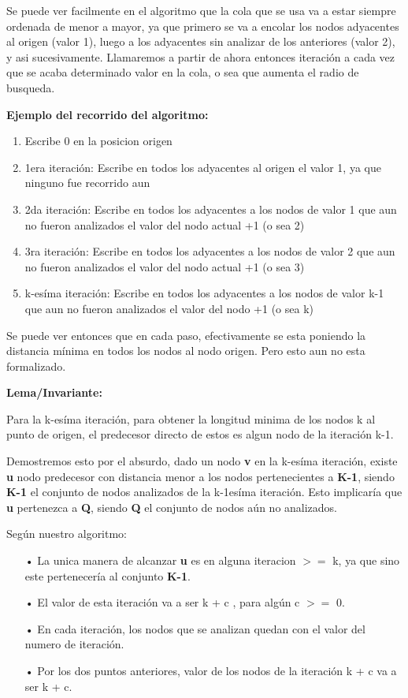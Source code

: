 Se puede ver facilmente en el algoritmo que la cola que se usa va a estar siempre ordenada de menor a mayor, ya que primero se va a encolar los nodos adyacentes al origen (valor 1), luego a los adyacentes sin analizar de los anteriores (valor 2), y asi sucesivamente. Llamaremos a partir de ahora entonces iteración a cada vez que se acaba determinado valor en la cola, o sea que aumenta el radio de busqueda.

\textbf{Ejemplo del recorrido del algoritmo:}

\begin{enumerate}
\item Escribe 0 en la posicion origen
\item 1era iteración: Escribe en todos los adyacentes al origen el valor 1, ya que ninguno fue recorrido aun
\item 2da iteración: Escribe en todos los adyacentes a los nodos de valor 1 que aun no fueron analizados el valor del nodo actual +1 (o sea 2)
\item 3ra iteración: Escribe en todos los adyacentes a los nodos de valor 2 que aun no fueron analizados el valor del nodo actual +1 (o sea 3)
\item k-esíma iteración: Escribe en todos los adyacentes a los nodos de valor k-1 que aun no fueron analizados el valor del nodo +1 (o sea k)
\end{enumerate}

Se puede ver entonces que en cada paso, efectivamente se esta poniendo la distancia mínima en todos los nodos al nodo origen. Pero esto aun no esta formalizado.

\bigskip
\textbf{Lema/Invariante:}

Para la k-esíma iteración, para obtener la longitud minima de los nodos k al punto de origen, el predecesor directo de estos es algun nodo de la iteración k-1.

Demostremos esto por el absurdo, dado un nodo \textbf{v} en la k-esíma iteración, existe \textbf{u} nodo predecesor con distancia menor a los nodos pertenecientes a \textbf{K-1}, siendo \textbf{K-1} el conjunto de nodos analizados de la k-1esíma iteración. Esto implicaría que \textbf{u} pertenezca a \textbf{Q}, siendo \textbf{Q} el conjunto de nodos aún no analizados.

Según nuestro algoritmo: 
\begin{itemize}
\item[•]La unica manera de alcanzar \textbf{u} es en alguna iteracion $>=$ k, ya que sino este pertenecería al conjunto \textbf{K-1}.
\item[•]El valor de esta iteración va a ser k + c , para algún c $>=$ 0.
\item[•]En cada iteración, los nodos que se analizan quedan con el valor del numero de iteración.
\item[•]Por los dos puntos anteriores, valor de los nodos de la iteración k + c va a ser k + c. 
\end{itemize}

